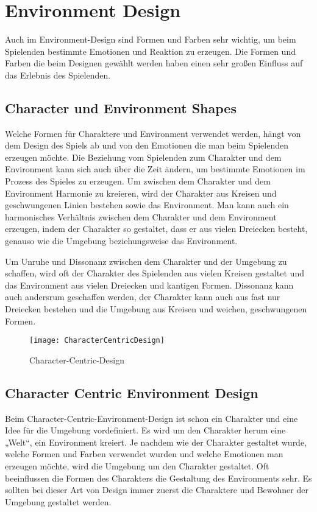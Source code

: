 \section{Environment Design}
Auch im Environment-Design sind Formen und Farben sehr wichtig, um beim Spielenden bestimmte Emotionen und Reaktion zu erzeugen. Die Formen und Farben die beim Designen gewählt werden haben einen sehr großen Einfluss auf das Erlebnis des Spielenden. 
\cite{_drawing_basics_and_video_game_art}

\subsection{Character und Environment Shapes}
Welche Formen für Charaktere und Environment verwendet werden, hängt von dem Design des Spiels ab und von den Emotionen die man beim Spielenden erzeugen möchte. Die Beziehung vom Spielenden zum Charakter und dem Environment kann sich auch über die Zeit ändern, um bestimmte Emotionen im Prozess des Spieles zu erzeugen. 
\cite{_drawing_basics_and_video_game_art}
Um zwischen dem Charakter und dem Environment Harmonie zu kreieren, wird der Charakter aus Kreisen und geschwungenen Linien bestehen sowie das Environment. Man kann auch ein harmonisches Verhältnis zwischen dem Charakter und dem Environment erzeugen, indem der Charakter so gestaltet, dass er aus vielen Dreiecken besteht, genauso wie die Umgebung beziehungsweise das Environment.
\cite{_drawing_basics_and_video_game_art}

Um Unruhe und Dissonanz zwischen dem Charakter und der Umgebung zu schaffen, wird oft der Charakter des Spielenden aus vielen Kreisen gestaltet und das Environment aus vielen Dreiecken und kantigen Formen. Dissonanz kann auch andersrum geschaffen werden, der Charakter kann auch aus fast nur Dreiecken bestehen und die Umgebung aus Kreisen und weichen, geschwungenen Formen. 
\cite{_drawing_basics_and_video_game_art}

\begin{figure}[H]
	\centering
	\texttt{[image: CharacterCentricDesign]}
	\caption{Character-Centric-Design\cite{_drawing_basics_and_video_game_art}}
\end{figure}

\subsection{Character Centric Environment Design }
Beim Character-Centric-Environment-Design ist schon ein Charakter und eine Idee für die Umgebung vordefiniert. Es wird um den Charakter herum eine „Welt“, ein Environment kreiert. Je nachdem wie der Charakter gestaltet wurde, welche Formen und Farben verwendet wurden und welche Emotionen man erzeugen möchte, wird die Umgebung um den Charakter gestaltet. Oft beeinflussen die Formen des Charakters die Gestaltung des Environments sehr. Es sollten bei dieser Art von Design immer zuerst die Charaktere und Bewohner der Umgebung gestaltet werden.
\cite{_drawing_basics_and_video_game_art}








